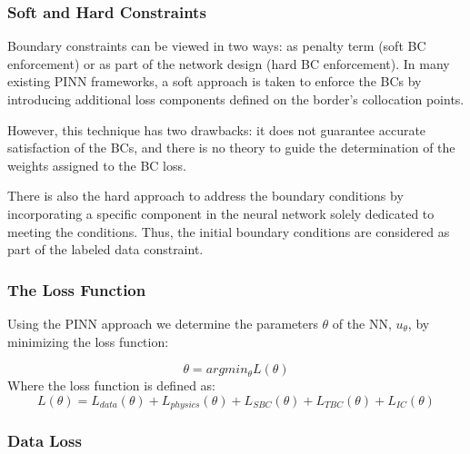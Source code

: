 \documentclass{article}
\begin{document}


\subsubsection{Soft and Hard Constraints}

Boundary constraints can be viewed in two ways: as penalty term (soft BC enforcement) or as part of the network design (hard BC enforcement). In many existing PINN frameworks, a soft approach is taken to enforce the BCs by introducing additional loss components defined on the border's collocation points.

However, this technique has two drawbacks: it does not guarantee accurate satisfaction of the BCs, and there is no theory to guide the determination of the weights assigned to the BC loss.

There is also the hard approach to address the boundary conditions by incorporating a specific component in the neural network solely dedicated to meeting the conditions. Thus, the initial boundary conditions are considered as part of the labeled data constraint.




\subsubsection{The Loss Function}

Using the PINN approach we determine the parameters $\theta$ of the NN, $u_\theta$, by minimizing the loss function:

$$
\theta = argmin_\theta L(\theta)
$$
Where the loss function is defined as:
$$
L(\theta) = L_{data}(\theta) + L_{physics}(\theta) + L_{SBC}(\theta) + L_{TBC}(\theta)+ L_{IC}(\theta)
$$

\subsubsection*{Data Loss}
\end{document}
